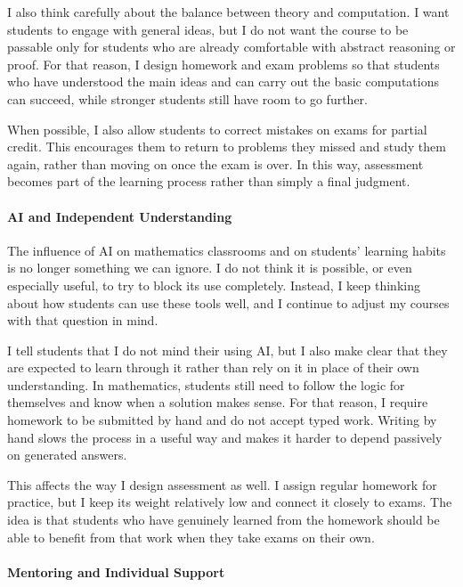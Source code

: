 \documentclass[11pt]{article}
\begin{document}
I also think carefully about the balance between theory and computation. I want students to engage with general ideas, but I do not want the course to be passable only for students who are already comfortable with abstract reasoning or proof. For that reason, I design homework and exam problems so that students who have understood the main ideas and can carry out the basic computations can succeed, while stronger students still have room to go further.

When possible, I also allow students to correct mistakes on exams for partial credit. This encourages them to return to problems they missed and study them again, rather than moving on once the exam is over. In this way, assessment becomes part of the learning process rather than simply a final judgment.

\paragraph{AI and Independent Understanding}\quad

The influence of AI on mathematics classrooms and on students' learning habits is no longer something we can ignore. I do not think it is possible, or even especially useful, to try to block its use completely. Instead, I keep thinking about how students can use these tools well, and I continue to adjust my courses with that question in mind.

I tell students that I do not mind their using AI, but I also make clear that they are expected to learn through it rather than rely on it in place of their own understanding. In mathematics, students still need to follow the logic for themselves and know when a solution makes sense. For that reason, I require homework to be submitted by hand and do not accept typed work. Writing by hand slows the process in a useful way and makes it harder to depend passively on generated answers.

This affects the way I design assessment as well. I assign regular homework for practice, but I keep its weight relatively low and connect it closely to exams. The idea is that students who have genuinely learned from the homework should be able to benefit from that work when they take exams on their own.

\paragraph{Mentoring and Individual Support}\quad
\end{document}
